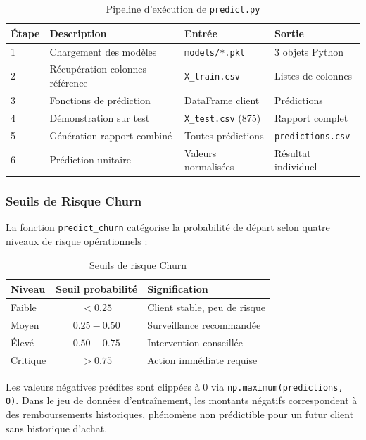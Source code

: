 \documentclass[11pt,a4paper]{article}
\begin{document}
\begin{table}[H]
	\centering
	\caption{Pipeline d'exécution de \texttt{predict.py}}
	\label{tab:pipeline_predict}
	\begin{tabular}{|l|l|l|l|}
		\hline
		\textbf{Étape} & \textbf{Description} & \textbf{Entrée} & \textbf{Sortie} \\
		\hline
		1 & Chargement des modèles & \texttt{models/*.pkl} & 3 objets Python \\
		2 & Récupération colonnes référence & \texttt{X\_train.csv} & Listes de colonnes \\
		3 & Fonctions de prédiction & DataFrame client & Prédictions \\
		4 & Démonstration sur test & \texttt{X\_test.csv} (875) & Rapport complet \\
		5 & Génération rapport combiné & Toutes prédictions & \texttt{predictions.csv} \\
		6 & Prédiction unitaire & Valeurs normalisées & Résultat individuel \\
		\hline
	\end{tabular}
\end{table}
\subsubsection{Seuils de Risque Churn}

La fonction \texttt{predict\_churn} catégorise la probabilité de départ selon quatre niveaux de risque opérationnels :

\begin{table}[H]
	\centering
	\caption{Seuils de risque Churn}
	\label{tab:risk_thresholds}
	\begin{tabular}{|l|c|l|}
		\hline
		\textbf{Niveau} & \textbf{Seuil probabilité} & \textbf{Signification} \\
		\hline
		Faible & $< 0.25$ & Client stable, peu de risque \\
		Moyen & $0.25 - 0.50$ & Surveillance recommandée \\
		Élevé & $0.50 - 0.75$ & Intervention conseillée \\
		Critique & $> 0.75$ & Action immédiate requise \\
		\hline
	\end{tabular}
\end{table}
\begin{tcolorbox}[colback=codegreen!10, colframe=codegreen, title=\textbf{Note sur \texttt{predict\_monetary}}]
	Les valeurs négatives prédites sont clippées à 0 via \texttt{np.maximum(predictions, 0)}. Dans le jeu de données d'entraînement, les montants négatifs correspondent à des remboursements historiques, phénomène non prédictible pour un futur client sans historique d'achat.
\end{tcolorbox}
\end{document}
